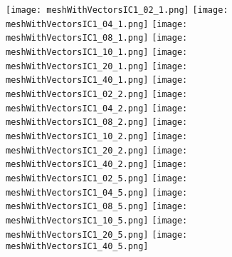 \documentclass{InsightArticle}
\begin{document}
\begin{figure}
\center
\texttt{[image: meshWithVectorsIC1\_02\_1.png]}
\texttt{[image: meshWithVectorsIC1\_04\_1.png]}
\texttt{[image: meshWithVectorsIC1\_08\_1.png]}
\texttt{[image: meshWithVectorsIC1\_10\_1.png]}
\texttt{[image: meshWithVectorsIC1\_20\_1.png]}
\texttt{[image: meshWithVectorsIC1\_40\_1.png]}
\texttt{[image: meshWithVectorsIC1\_02\_2.png]}
\texttt{[image: meshWithVectorsIC1\_04\_2.png]}
\texttt{[image: meshWithVectorsIC1\_08\_2.png]}
\texttt{[image: meshWithVectorsIC1\_10\_2.png]}
\texttt{[image: meshWithVectorsIC1\_20\_2.png]}
\texttt{[image: meshWithVectorsIC1\_40\_2.png]}
\texttt{[image: meshWithVectorsIC1\_02\_5.png]}
\texttt{[image: meshWithVectorsIC1\_04\_5.png]}
\texttt{[image: meshWithVectorsIC1\_08\_5.png]}
\texttt{[image: meshWithVectorsIC1\_10\_5.png]}
\texttt{[image: meshWithVectorsIC1\_20\_5.png]}
\texttt{[image: meshWithVectorsIC1\_40\_5.png]}
\label{fig:VectorIC1Smoothings}
\end{figure}
\end{document}
